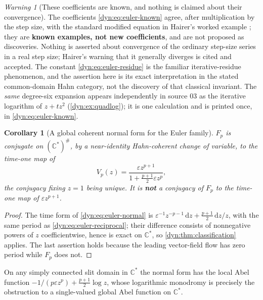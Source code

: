 \documentclass[11pt,letterpaper]{article}
\newtheorem{corollary}[corollary]{Corollary}
\theoremstyle{definition}
\theoremstyle{remark}
\newtheorem{warning}[warning]{Warning}
\newcommand{\C}{\mathbb C}
\newcommand{\eps}{\varepsilon}
\newcommand{\dd}{\,\mathrm d}
\numberwithin{equation}{section}
\begin{document}
\begin{warning}[These coefficients are known, and nothing is claimed about
their convergence]\label{dyn:warn:hairer}
The coefficients \eqref{dyn:eq:euler-known} agree, after multiplication by
the step size, with the standard modified equation in Hairer's worked
example \cite{Hairer}; they are \textbf{known examples, not new
coefficients}, and are not proposed as discoveries. Nothing is asserted
about convergence of the ordinary step-size series in a real step size;
Hairer's warning that it generally diverges is cited and accepted. The
constant \eqref{dyn:eq:euler-residue} is the familiar iterative-residue
phenomenon, and the assertion here is its exact interpretation in the
stated common-domain Hahn category, not the discovery of that classical
invariant. The \emph{same} degree-six expansion appears independently in
source 03 as the iterative logarithm of $z+tz^{2}$
(\cref{dyn:ex:quadlog}); it is one calculation and is printed once, in
\eqref{dyn:eq:euler-known}.
\end{warning}

\begin{corollary}[A global coherent normal form for the Euler family]
\label{dyn:cor:euler-normal}
$F_p$ is conjugate on $(\C^{*})^{\#}$, by a near-identity Hahn-coherent
change of variable, to the time-one map of
\begin{equation}\label{dyn:eq:euler-normal}
 V_p(z)=\frac{\eps z^{p+1}}{1+\frac{p+1}{2}\eps z^{p}} ,
\end{equation}
the conjugacy fixing $z=1$ being unique. It is \textbf{not} a conjugacy of
$F_p$ to the time-one map of $\eps z^{p+1}$.
\end{corollary}
\begin{proof}
The time form of \eqref{dyn:eq:euler-normal} is
$\eps^{-1}z^{-p-1}\dd z+\frac{p+1}2\dd z/z$, with the same period as
\eqref{dyn:eq:euler-reciprocal}; their difference consists of nonnegative
powers of $z$ coefficientwise, hence is exact on $\C^{*}$, so
\cref{dyn:thm:classification} applies. The last assertion holds because the
leading vector-field flow has zero period while $F_p$ does not.
\end{proof}

On any simply connected slit domain in $\C^{*}$ the normal form has the
local Abel function $-1/(p\eps z^{p})+\frac{p+1}2\log z$, whose logarithmic
monodromy is precisely the obstruction to a single-valued global Abel
function on $\C^{*}$.
\end{document}

